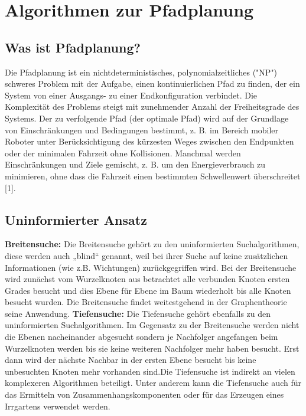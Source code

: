\chapter{Algorithmen zur Pfadplanung}
\section{Was ist Pfadplanung?}
Die Pfadplanung ist ein nichtdeterministisches, polynomialzeitliches ("NP") schweres Problem mit der Aufgabe, 
einen kontinuierlichen Pfad zu finden, der ein System von einer Ausgangs- zu einer Endkonfiguration verbindet. 
Die Komplexität des Problems steigt mit zunehmender Anzahl der Freiheitsgrade des Systems. Der zu verfolgende 
Pfad (der optimale Pfad) wird auf der Grundlage von Einschränkungen und Bedingungen bestimmt, z. B. im Bereich
mobiler Roboter unter Berücksichtigung des kürzesten Weges zwischen den Endpunkten oder der minimalen Fahrzeit
ohne Kollisionen. Manchmal werden Einschränkungen und Ziele gemischt, z. B. um den Energieverbrauch zu minimieren,
ohne dass die Fahrzeit einen bestimmten Schwellenwert überschreitet [1].

\section{Uninformierter Ansatz}
\label{Uninformierter Ansatz}
\textbf{Breitensuche:}\linebreak
Die Breitensuche gehört zu den uninformierten Suchalgorithmen, diese werden auch „blind“ genannt, weil bei ihrer 
Suche auf keine zusätzlichen Informationen (wie z.B. Wichtungen) zurückgegriffen wird.
Bei der Breitensuche wird zunächst vom Wurzelknoten aus betrachtet alle verbunden Knoten ersten Grades besucht
 und dies Ebene für Ebene im Baum wiederholt bis alle Knoten besucht wurden. 
Die Breitensuche findet weitestgehend in der Graphentheorie seine Anwendung.\cite{Russell:10b}
\linebreak\linebreak
\textbf{Tiefensuche:}\linebreak
Die Tiefensuche gehört ebenfalls zu den uninformierten Suchalgorithmen.
Im Gegensatz zu der Breitensuche werden nicht die Ebenen nacheinander abgesucht sondern je Nachfolger angefangen 
beim Wurzelknoten werden bis sie keine weiteren Nachfolger mehr haben besucht. Erst dann wird der nächste Nachbar 
in der ersten Ebene besucht bis keine unbesuchten Knoten mehr vorhanden sind.Die Tiefensuche ist indirekt an vielen 
komplexeren Algorithmen beteiligt. Unter anderem kann die Tiefensuche auch für das Ermitteln von Zusammenhangskomponenten
oder für das Erzeugen eines Irrgartens verwendet werden.
\cite{Russell:10c}